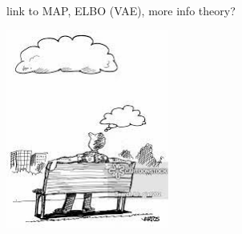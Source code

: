 \documentclass[smaller]{beamer}
\begin{document}
\begin{frame}[t]


\vskip 1cm

\center

link to MAP, ELBO (VAE), more info theory?

\vskip 0.5cm

\includegraphics[width=0.4\textwidth]{Pics/thoughts}


\end{frame}



\end{document}
